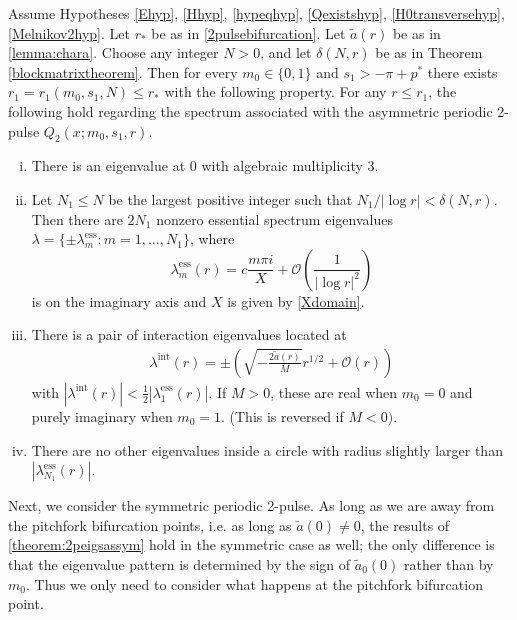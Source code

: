 \documentclass[thesis.tex]{subfiles}
\begin{document}
\begin{theorem}\label{theorem:2peigsassym}
Assume Hypotheses \ref{Ehyp}, \ref{Hhyp}, \ref{hypeqhyp}, \ref{Qexistshyp}, \ref{H0transversehyp}, \ref{Melnikov2hyp}. Let $r_*$ be as in \cref{2pulsebifurcation}. Let $\tilde{a}(r)$ be as in \cref{lemma:chara}. Choose any integer $N > 0$, and let $\delta(N,r)$ be as in Theorem \ref{blockmatrixtheorem}. Then for every $m_0 \in \{0, 1\}$ and $s_1 > -\pi + p^*$ there exists $r_1 = r_1(m_0, s_1, N) \leq r_*$ with the following property. For any $r \leq r_1$, the following hold regarding the spectrum associated with the asymmetric periodic 2-pulse $Q_2(x; m_0, s_1, r)$.

\begin{enumerate}[(i)]
\item There is an eigenvalue at 0 with algebraic multiplicity 3. 
\item Let $N_1 \leq N$ be the largest positive integer such that $N_1/|\log r| < \delta(N,r)$. Then there are $2N_1$ nonzero essential spectrum eigenvalues $\lambda = \{ \pm \lambda_m^{\text{ess}} : m = 1, \dots, N_1 \}$, where
\[
\lambda_m^{\text{ess}}(r) = c \frac{m \pi i}{X}+  \mathcal{O}\left( \frac{1}{|\log r|^2} \right)
\]
is on the imaginary axis and $X$ is given by \cref{Xdomain}.

\item There is a pair of interaction eigenvalues located at
	\begin{align*}
	\lambda^{\text{int}}(r) = \pm \left( \sqrt{-\frac{2 \tilde{a}(r)}{M}}r^{1/2} + \mathcal{O}\left( r \right) \right)
	\end{align*}
with $|\lambda^{\text{int}}(r)| < \frac{1}{2}|\lambda_1^{\text{ess}}(r)|$. If $M > 0$, these are real when $m_0 = 0$ and purely imaginary when $m_0 = 1$. (This is reversed if $M < 0)$. 
\item There are no other eigenvalues inside a circle with radius slightly larger than $|\lambda_{N_1}^{\text{ess}}(r)|$.
\end{enumerate}
\end{theorem}

Next, we consider the symmetric periodic 2-pulse. As long as we are away from the pitchfork bifurcation points, i.e. as long as $\tilde{a}(0) \neq 0$, the results of \cref{theorem:2peigsassym} hold in the symmetric case as well; the only difference is that the eigenvalue pattern is determined by the sign of $\tilde{a}_0(0)$ rather than by $m_0$. Thus we only need to consider what happens at the pitchfork bifurcation point.
\end{document}
